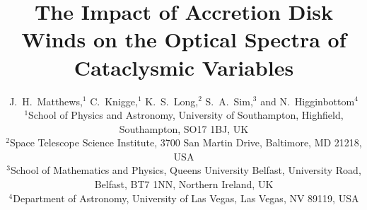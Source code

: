 \documentclass[preprint, a4paper, 11pt]{aastex}
\begin{document}

\renewcommand{\labelitemi}{$\bullet$}
\def\py{\textsc{Python}}
\def\tar{\textsc{Tardis} }
\def\cld{\textsc{Cloudy} }
\def\civ{C~\textsc{iv} }
\def\araa{ARAA}
\def\nat{Nature}
\def\apjl{ApJ Letters}
\def\aapr{AAPR}
\def\actaa{ACTAA} 
\def\ssr{SSR}
\def\apj{ApJ}
\def\apss{AP\&SS}
\def\pasp{PASP}
\def\aap{A\&A}
\def\mnras{MNRAS}
\def\aj{AJ}
\def\rmxaa{RMXAA}

\def\heiiopt{He~\textsc{ii}~$\lambda4686$}
\def\heiiuv{He~\textsc{ii}~$\lambda1640$}
\def\heiioptnew{He~\textsc{ii}~$\lambda3202$}
\def\la{Ly$\alpha$}
\def\ha{H$\alpha$}
\def\hb{H$\beta$}
\def\civfull{C~\textsc{iv}~$\lambda1550$}

%
%


\title{The Impact of Accretion Disk Winds on the Optical Spectra of Cataclysmic Variables}

\author[Matthews et al.]{J.~H.~Matthews,$^1$ C.~Knigge,$^1$ K.~S.~Long,$^2$ S.~A.~Sim,$^3$ and N.~Higginbottom$^4$
\medskip  
\\$^1$School of Physics and Astronomy, University of Southampton, Highfield, Southampton, SO17 1BJ, UK
\\$^2$Space Telescope Science Institute, 3700 San Martin Drive, Baltimore, MD 21218, USA
\\$^3$School of Mathematics and Physics, Queens University Belfast, University Road, Belfast, BT7 1NN, Northern Ireland, UK
\\$^4$Department of Astronomy, University of Las Vegas, Las Vegas, NV 89119, USA}




%
%
\end{document}
